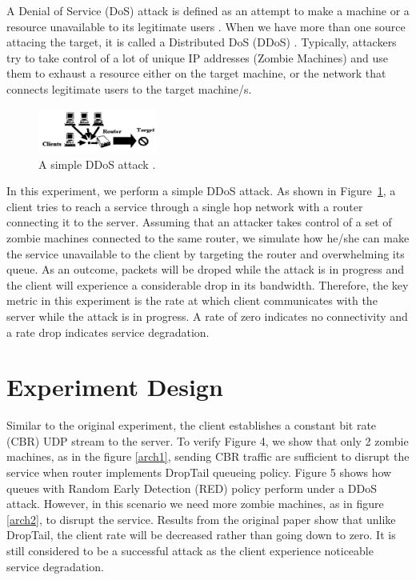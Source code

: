 \documentclass[12pt,twocolumn]{article}
\begin{document}
A Denial of Service (DoS) attack is defined as an attempt to make a machine or a resource unavailable to its legitimate users \cite{bellovin1989security}.
When we have more than one source attacing the target, it is called a Distributed DoS (DDoS) \cite{lau2000distributed}.
Typically, attackers try to take control of a lot of unique IP addresses (Zombie Machines) and use them to exhaust a resource either on the target machine, or the network that connects legitimate users to the target machine/s.

\begin{figure}
    \centering
    \includegraphics[width=0.35\textwidth]{../Figures/sample.png} \caption{A simple DDoS attack \cite{lau2000distributed}.} \label{sampleDDoS}
\end{figure}

In this experiment, we perform a simple DDoS attack.
As shown in Figure~\ref{sampleDDoS}, a client tries to reach a service through a single hop network with a router connecting it to the server.
Assuming that an attacker takes control of a set of zombie machines connected to the same router, we simulate how he/she can make the service unavailable to the client by targeting the router and overwhelming its queue.
As an outcome, packets will be droped while the attack is in progress and the client will experience a considerable drop in its bandwidth.
Therefore, the key metric in this experiment is the rate at which client communicates with the server while the attack is in progress.
A rate of zero indicates no connectivity and a rate drop indicates service degradation.

\section {Experiment Design}

Similar to the original experiment, the client establishes a constant bit rate (CBR) UDP stream to the server.
To verify Figure 4, we show that only 2 zombie machines, as in the figure \ref{arch1}, sending CBR traffic are sufficient to disrupt the service when router implements DropTail queueing policy.
Figure 5 shows how queues with Random Early Detection (RED) policy perform under a DDoS attack.
However, in this scenario we need more zombie machines, as in figure \ref{arch2}, to disrupt the service.
Results from the original paper show that unlike DropTail, the client rate will be decreased rather than going down to zero.
It is still considered to be a successful attack as the client experience noticeable service degradation.
\end{document}
